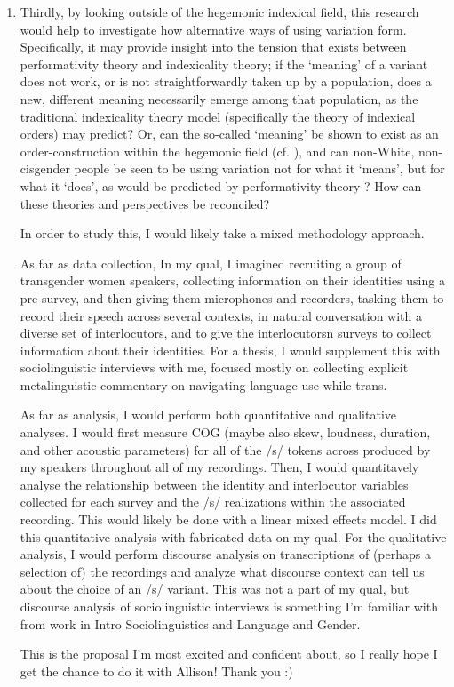 \documentclass[11pt]{article}
\begin{document}
\begin{enumerate}
\item Thirdly, by looking outside of the hegemonic indexical field, this research would help to investigate how alternative ways of using variation form. Specifically, it may provide insight into the tension that exists between performativity theory and indexicality theory; if the `meaning' of a variant does not work, or is not straightforwardly taken up by a population, does a new, different meaning necessarily emerge among that population, as the traditional indexicality theory model (specifically the theory of indexical orders) may predict? Or, can the so-called `meaning' be shown to exist as an order-construction within the hegemonic field (cf. \cite{deleuze_november_1987}), and can non-White, non-cisgender people be seen to be using variation not for what it `means', but for what it `does', as would be predicted by performativity theory \parencite[see][]{butler_gender_1990, livia_its_1997}? How can these theories and perspectives be reconciled?

In order to study this, I would likely take a mixed methodology approach. 

As far as data collection, In my qual, I imagined  recruiting a group of transgender women speakers, collecting information on their identities using a pre-survey, and then giving them microphones and recorders, tasking them to record their speech across several contexts, in natural conversation with a diverse set of interlocutors, and to give the interlocutorsn surveys to collect information about their identities. For a thesis, I would supplement this with sociolinguistic interviews with me, focused mostly on collecting explicit metalinguistic commentary on navigating language use while trans. 

As far as analysis, I would perform both quantitative and qualitative analyses. I would first measure COG (maybe also skew, loudness, duration, and other acoustic parameters) for all of the /s/ tokens across produced by my speakers throughout all of my recordings. Then, I would quantitavely analyse the relationship between the identity and interlocutor variables collected for each survey and the /s/ realizations within the associated recording. This would likely be done with a linear mixed effects model. I did this quantitative analysis with fabricated data on my qual. For the qualitative analysis, I would perform discourse analysis on transcriptions of (perhaps a selection of) the recordings and analyze what discourse context can tell us about the choice of an /s/ variant. This was not a part of my qual, but discourse analysis of sociolinguistic interviews is something I'm familiar with from work in Intro Sociolinguistics and Language and Gender.

This is the proposal I'm most excited and confident about, so I really hope I get the chance to do it with Allison! Thank you :)

\printbibliography[title=References with Annotations]


\end{enumerate}
\end{document}
